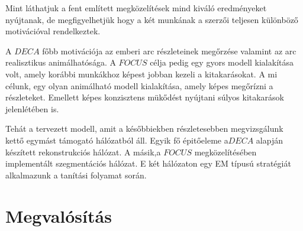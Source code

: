 \documentclass[12pt,a4]{article}
\begin{document}
            Mint láthatjuk a fent említett megközelítések mind kiváló eredményeket nyújtanak, de megfigyelhetjük hogy a két munkának a szerzői teljesen különböző motivációval rendelkeztek.
            
         	A $DECA$ főbb motivációja az emberi arc részleteinek megőrzése valamint az arc realisztikus animálhatósága. A $FOCUS$ célja pedig egy gyors modell kialakítása volt, amely korábbi munkákhoz képest jobban kezeli a kitakarásokat. A mi célunk, egy olyan animálható modell kialakítása, amely képes megőrízni a részleteket. Emellett képes konzisztens mükődést nyújtani súlyos kitakarások jelenlétében is.
 	
 	          Tehát a tervezett modell, amit a későbbiekben részletesebben
 	          megvizsgálunk kettő egymást támogató hálózatból áll. Egyik fő 
            épitőeleme a$DECA$ alapján készített rekonstrukciós hálózat. A másik,a $FOCUS$ megközelítésében implementált szegmentációs hálózat. E két hálózaton egy EM típusú stratégiát alkalmazunk a tanítási folyamat során.

            
    \section{Megvalósítás}
 	
 	    

        

 
\end{document}
